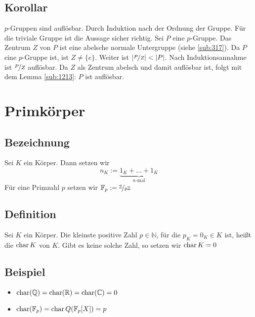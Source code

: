 \subsection[Korollar: $p$-Gruppen sind auflösbar]{Korollar} %
\label{sub:1214}
$p$-Gruppen sind auflösbar.
Durch Induktion nach der Ordnung der Gruppe. Für die triviale Gruppe ist die Aussage sicher richtig. Sei $P$ eine $p$-Gruppe. Das Zentrum $Z$ von $P$ ist eine abelsche 
normale Untergruppe (siehe \ref{sub:317}). Da $P$ eine $p$-Gruppe ist, ist $Z\not= \{e\}$. Weiter ist $\abs*{\nicefrac{P}{Z}} < \abs*{P}  $. Nach Induktionsannahme ist
$\nicefrac{P}{Z}$ auflösbar. Da $Z$ als Zentrum abelsch und damit auflösbar ist, folgt mit dem Lemma \ref{sub:1213}: $P$ ist auflösbar. \bewende
\newpage
\section{Primkörper} %
\label{sec:13}
\subsection[Bezeichnung: Natürliche Zahl in einem beliebigen Körper]{Bezeichnung} %
\label{sub:131}
Sei $K$ ein Körper. Dann setzen wir
\[
	n_K := \underbrace{1_K + \ldots + 1_K}_{n \text{-mal}} \tag{oft auch kurz $n=n_K$}
\]
Für eine Primzahl $p$ setzen wir $\mathds{F}_p := \nicefrac{\mathds{Z}}{p \mathds{Z}}$

\subsection[Definition: Charakteristik eines Körpers]{Definition} %
\label{sub:132}
Sei $K$ ein Körper. Die kleinste positive Zahl $p \in \mathds{N}$, für die $p_K=0_K \in K$ ist, heißt die  $\Char K$ von $K$. Gibt es keine solche Zahl, so setzen wir $\Char K =0$ 

\subsection[Beispiele für Charakteristiken]{Beispiel} %
\label{sub:133}
\begin{itemize}
	\item $\Char (\mathds{Q}) = \Char(\mathds{R})= \Char(\mathds{C}) =0$
	\item $\Char (\mathds{F}_p) = \Char Q(\mathds{F}_p[X])= p$
\end{itemize}

